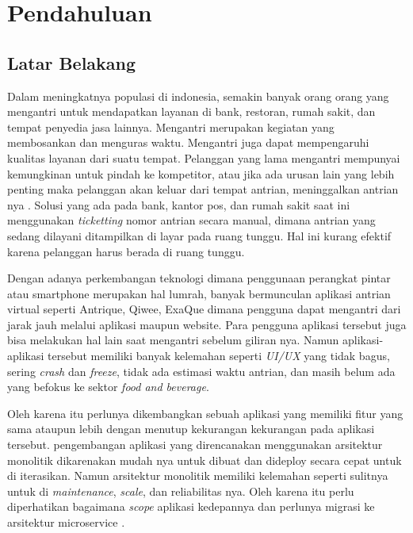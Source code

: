 \chapter{Pendahuluan}

\section{Latar Belakang}
Dalam meningkatnya populasi di indonesia, semakin banyak orang orang yang mengantri untuk mendapatkan layanan di bank, restoran, rumah sakit, dan tempat penyedia jasa lainnya. Mengantri merupakan kegiatan yang membosankan dan menguras waktu. Mengantri juga dapat mempengaruhi kualitas layanan dari suatu tempat. Pelanggan yang lama mengantri mempunyai kemungkinan untuk pindah ke kompetitor, atau jika ada urusan lain yang lebih penting maka pelanggan akan keluar dari tempat antrian, meninggalkan antrian nya \cite{khong2017queue}\cite{Ghazal2016}\cite{Uddin2016}. Solusi yang ada pada bank, kantor pos, dan rumah sakit saat ini menggunakan \textit{ticketting} nomor antrian secara manual, dimana antrian yang sedang dilayani ditampilkan di layar pada ruang tunggu. Hal ini kurang efektif karena pelanggan harus berada di ruang tunggu\cite{Ghazal2016}.

Dengan adanya perkembangan teknologi dimana penggunaan perangkat pintar atau smartphone merupakan hal lumrah, banyak bermunculan aplikasi antrian virtual seperti Antrique, Qiwee, ExaQue dimana pengguna dapat mengantri dari jarak jauh melalui aplikasi maupun website. Para pengguna aplikasi tersebut juga bisa melakukan hal lain saat mengantri sebelum giliran nya. Namun aplikasi-aplikasi tersebut memiliki banyak kelemahan seperti \textit{UI/UX} yang tidak bagus, sering \textit{crash} dan \textit{freeze}, tidak ada estimasi waktu antrian, dan masih belum ada yang befokus ke sektor \textit{food and beverage}.

Oleh karena itu perlunya dikembangkan sebuah aplikasi yang memiliki fitur yang sama ataupun lebih dengan menutup kekurangan kekurangan pada aplikasi tersebut. pengembangan aplikasi yang direncanakan menggunakan arsitektur monolitik dikarenakan mudah nya untuk dibuat dan dideploy secara cepat untuk di iterasikan. Namun arsitektur monolitik memiliki kelemahan seperti sulitnya untuk di \textit{maintenance}, \textit{scale}, dan reliabilitas nya. Oleh karena itu perlu diperhatikan bagaimana \textit{scope} aplikasi kedepannya dan perlunya migrasi ke arsitektur microservice \cite{gos2020comparison} \cite{jatkiewicz2023differences}.

